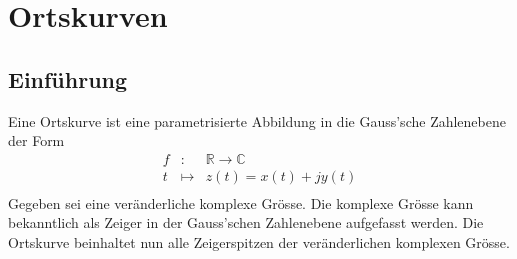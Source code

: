 \begin{comment}
\subsection{Satz von Moivre}
\begin{enumerate}[$\texttt{>}\texttt{>}$]
\item {\color{red}\texttt{(-sqrt(3)-i)\^\,10 => 5.1200e+02 - 8.8681e+02i}}
\item {\color{red}\texttt{abs((-sqrt(3)-i)\^\,10) => 1.0240e+03}}
\item {\color{red}\texttt{angle((-sqrt(3)-i)\^\,10) => -1.0472}}
\item {\color{red}\texttt{(-sqrt(3)-i)\^\,(1/3) => 0.8099 - 0.9652i}}
\item {\color{red}\texttt{double(solve('z\^\,3-(-sqrt(3)-i)')) => 0.8099 - 0.9652i, -1.2408 - 0.2188i, 0.4309 + 1.1839i}}
\item {\color{red}\texttt{compass(double(solve('z\^\,3-(-sqrt(3)-i)')))}}
\end{enumerate}
\subsection{Eulersche Formel}
\begin{enumerate}[$\texttt{>}\texttt{>}$]
\item {\color{red}\texttt{log(-1) = 0.0000 + 3.1416i}}
\item {\color{red}\texttt{log(-10*i) = 2.3026 - 1.5708i}}
\item {\color{red}\texttt{log2(sqrt(2)-sqrt(2)*i) = 1.0000 - 1.1331i}}
\item {\color{red}\texttt{exp(1+i*pi) = -2.7183 + 0.0000i}}
\item {\color{red}\texttt{2\^i = 0.7692 + 0.6390i}}
\item {\color{red}\texttt{(-i)\^\,(-i) = 0.2079}}
\end{enumerate}
\end{comment}
\section{Ortskurven}
\subsection{Einführung}
Eine Ortskurve ist eine parametrisierte Abbildung in die Gauss'sche Zahlenebene der Form
\begin{equation}
\boxed{
\begin{array}{lll}
f&:&\mathbb{R}\rightarrow \mathbb{C}\\
t&\mapsto&z\left(t\right)=x\left(t\right)+jy\left(t\right)\\
\end{array}
}
\end{equation}
Gegeben sei eine veränderliche komplexe Grösse. Die komplexe Grösse kann bekanntlich als Zeiger in der Gauss'schen Zahlenebene aufgefasst werden. Die Ortskurve beinhaltet nun alle Zeigerspitzen der veränderlichen komplexen Grösse.
